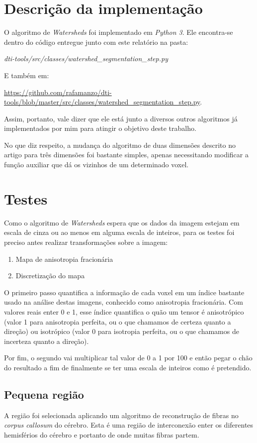 \documentclass[a4paper,11pt]{report}
\begin{document}
  \section{Descrição da implementação}
  O algoritmo de \textit{Watersheds} foi implementado em \textit{Python 3}. Ele encontra-se dentro do código entregue junto com este relatório na pasta:

  \textit{dti-tools/src/classes/watershed\_segmentation\_step.py}

  E também em:

  \url{https://github.com/rafamanzo/dti-tools/blob/master/src/classes/watershed_segmentation_step.py}.

  Assim, portanto, vale dizer que ele está junto a diversos outros algoritmos já implementados por mim para atingir o objetivo deste trabalho.

  No que diz respeito, a mudança do algoritmo de duas dimensões descrito no artigo para três dimensões foi bastante simples, apenas necessitando modificar a função auxiliar que dá os vizinhos de um determinado voxel.

  \section{Testes}
    Como o algoritmo de \textit{Watersheds} espera que os dados da imagem estejam em escala de cinza ou ao menos em alguma escala de inteiros, para os testes foi preciso antes realizar transformações sobre a imagem:

    \begin{enumerate}
      \item Mapa de anisotropia fracionária
      \item Discretização do mapa
    \end{enumerate}

    O primeiro passo quantifica a informação de cada voxel em um índice bastante usado na análise destas imagens, conhecido como anisotropia fracionária. Com valores reais enter 0 e 1, esse índice quantifica o quão um tensor é anisotrópico (valor 1 para anisotropia perfeita, ou o que chamamos de certeza quanto a direção) ou isotrópico (valor 0 para isotropia perfeita, ou o que chamamos de incerteza quanto a direção).

    Por fim, o segundo vai multiplicar tal valor de 0 a 1 por 100 e então pegar o chão do resultado a fim de finalmente se ter uma escala de inteiros como é pretendido.

    \subsection{Pequena região}
    A região foi selecionada aplicando um algoritmo de reconstrução de fibras no \textit{corpus callosum} do cérebro. Esta é uma região de interconexão enter os diferentes hemisférios do cérebro e portanto de onde muitas fibras partem.
\end{document}
